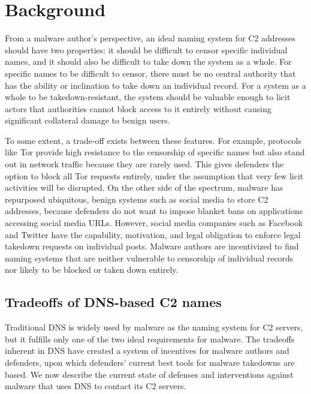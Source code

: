 \section{Background}
\label{sec:background}

From a malware author's perspective, an ideal naming system for C2 
addresses should have two properties: it should be difficult to censor specific 
individual names, and it should also be difficult to take down the system as a 
whole. For specific names to be difficult to censor, there must be no central 
authority that has the ability or inclination to take down an individual 
record. For a system as a whole to be takedown-resistant, the system should be 
valuable enough to licit actors that authorities cannot block access to it 
entirely without causing significant collateral damage to benign users.

To some extent, a trade-off exists between these features. For example,  
protocols like Tor provide high resistance to the 
censorship of specific names but also stand out in network traffic because they 
are rarely used. This gives defenders the option to block all Tor requests 
entirely, under the assumption that very few licit activities will be 
disrupted. On the other side of 
the spectrum, malware has repurposed ubiquitous, benign systems 
such as social media to store C2 addresses, because defenders do not 
want to impose blanket bans on applications accessing social 
media URLs. However, social media companies such as Facebook and 
Twitter have the capability, motivation, and legal obligation to enforce 
legal takedown requests on individual posts. Malware authors are incentivized 
to find naming systems that are neither vulnerable to censorship of individual 
records nor likely to be blocked or taken down entirely.

\subsection{Tradeoffs of DNS-based C2 names}

Traditional DNS is widely used by malware as the naming system for C2 
servers, but it fulfills only one of the two ideal requirements for malware. 
The tradeoffs inherent in DNS have created a system of incentives for malware 
authors and defenders, upon which defenders' current best tools for malware 
takedowns are based. We now describe the current state of defenses and 
interventions against malware that uses DNS to contact its C2 servers.
 
